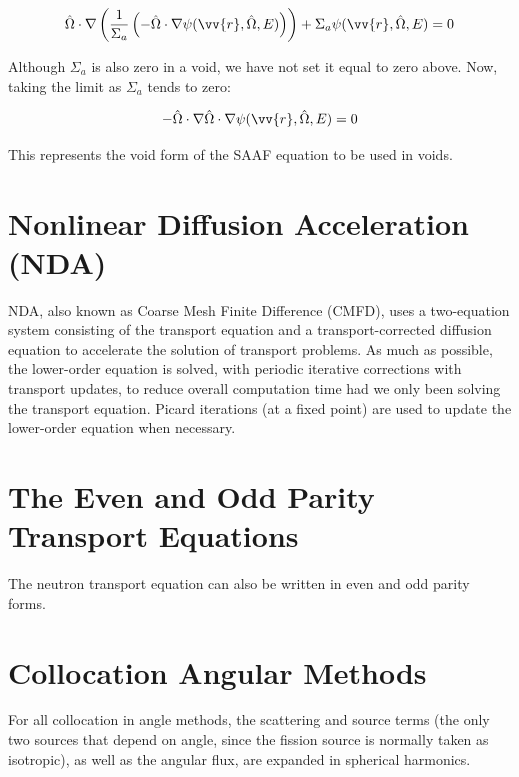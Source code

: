 \documentclass[10pt]{article}
\begin{document}
\begin{flushleft}
\begin{equation}
\label{eq:SAAFvoid1}
\hat{\Omega} \cdot \nabla \left( \frac{1}{\Sigma_a}\left(-\hat{\Omega}\cdot\nabla\psi(\vv{r}, \hat{\Omega}, E)\right)\right) + \Sigma_a\psi(\vv{r}, \hat{\Omega}, E) = 0
\end{equation}

Although \(\Sigma_a\) is also zero in a void, we have not set it equal to zero above. Now, taking the limit as \(\Sigma_a\) tends to zero:

\begin{equation}
\label{eq:SAAFvoid2}
-\hat{\Omega} \cdot \nabla\hat{\Omega}\cdot\nabla\psi(\vv{r}, \hat{\Omega}, E) = 0
\end{equation}

This represents the void form of the SAAF equation to be used in voids.




\section{Nonlinear Diffusion Acceleration (NDA)}


NDA, also known as Coarse Mesh Finite Difference (CMFD), uses a two-equation system consisting of the transport equation and a transport-corrected diffusion equation to accelerate the solution of transport problems. As much as possible, the lower-order equation is solved, with periodic iterative corrections with transport updates, to reduce overall computation time had we only been solving the transport equation. Picard iterations (at a fixed point) are used to update the lower-order equation when necessary. 




\section{The Even and Odd Parity Transport Equations}

The neutron transport equation can also be written in even and odd parity forms.





\section{Collocation Angular Methods}

For all collocation in angle methods, the scattering and source terms (the only two sources that depend on angle, since the fission source is normally taken as isotropic), as well as the angular flux, are expanded in spherical harmonics. 


\end{flushleft}
\end{document}

